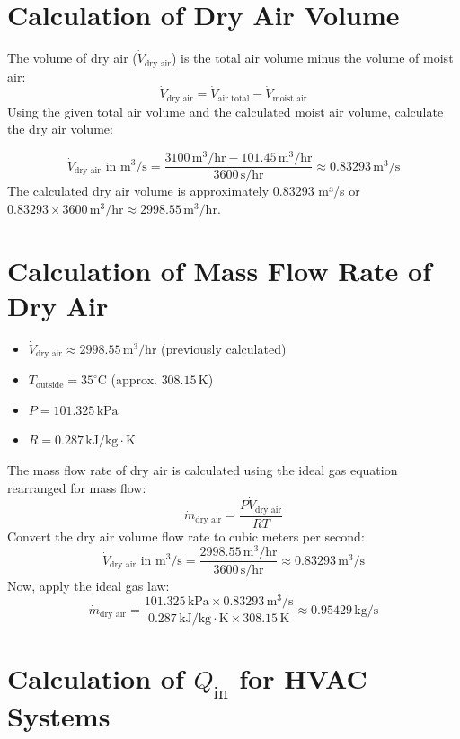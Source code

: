 \documentclass{article}
\begin{document}
\section{Calculation of Dry Air Volume}
\noindent
The volume of dry air (\( \dot{V}_{\text{dry air}} \)) is the total air volume minus the volume of moist air:
\[ \dot{V}_{\text{dry air}} = \dot{V}_{\text{air total}} - \dot{V}_{\text{moist air}} \]
\noindent
Using the given total air volume and the calculated moist air volume, calculate the dry air volume:

\[ \dot{V}_{\text{dry air}} \text{ in m}^3/\text{s} = \frac{3100 \, \text{m}^3/\text{hr} - 101.45 \, \text{m}^3/\text{hr}}{3600 \, \text{s/hr}} \approx 0.83293 \, \text{m}^3/\text{s} \]
\noindent
The calculated dry air volume is approximately 0.83293 m³/s or \( 0.83293 \times 3600 \, \text{m}^3/\text{hr} \approx 2998.55 \, \text{m}^3/\text{hr} \).

\section{Calculation of Mass Flow Rate of Dry Air}

\begin{itemize}
    \item \( \dot{V}_{\text{dry air}} \approx 2998.55 \, \text{m}^3/\text{hr} \) (previously calculated)
    \item \( T_{\text{outside}} = 35^\circ\text{C} \) (approx.  \( 308.15 \, \text{K} \))
    \item \( P = 101.325 \, \text{kPa} \)
    \item \( R = 0.287 \, \text{kJ/kg} \cdot \text{K} \)
\end{itemize}
\noindent
The mass flow rate of dry air is calculated using the ideal gas equation rearranged for mass flow:
\[ \dot{m}_{\text{dry air}} = \frac{P \dot{V}_{\text{dry air}}}{R T} \]
\noindent
Convert the dry air volume flow rate to cubic meters per second:
\[ \dot{V}_{\text{dry air}} \text{ in m}^3/\text{s} = \frac{2998.55 \, \text{m}^3/\text{hr}}{3600 \, \text{s/hr}} \approx 0.83293 \, \text{m}^3/\text{s} \]
\noindent
Now, apply the ideal gas law:
\[ \dot{m}_{\text{dry air}} = \frac{101.325 \, \text{kPa} \times 0.83293 \, \text{m}^3/\text{s}}{0.287 \, \text{kJ/kg} \cdot \text{K} \times 308.15 \, \text{K}} \approx 0.95429 \, \text{kg/s} \]

\section{Calculation of \( Q_{\text{in}} \) for HVAC Systems}
\end{document}
